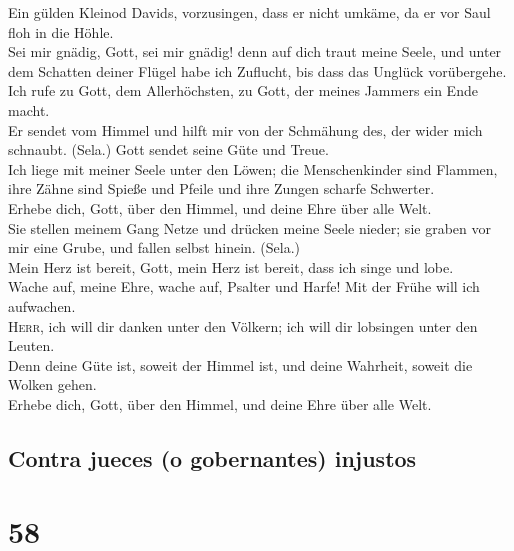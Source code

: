  Ein gülden Kleinod Davids, vorzusingen, dass er nicht
umkäme, da er vor Saul floh in die Höhle.\\
 Sei mir gnädig, Gott, sei mir gnädig! denn auf dich traut
meine Seele, und unter dem Schatten deiner Flügel habe ich Zuflucht, bis
dass das Unglück vorübergehe.\\
 Ich rufe zu Gott, dem Allerhöchsten, zu Gott, der meines
Jammers ein Ende macht.\\
 Er sendet vom Himmel und hilft mir von der Schmähung des,
der wider mich schnaubt. (Sela.) Gott sendet seine Güte und Treue.\\
 Ich liege mit meiner Seele unter den Löwen; die
Menschenkinder sind Flammen, ihre Zähne sind Spieße und Pfeile und ihre
Zungen scharfe Schwerter.\\
 Erhebe dich, Gott, über den Himmel, und deine Ehre über
alle Welt.\\
 Sie stellen meinem Gang Netze und drücken meine Seele
nieder; sie graben vor mir eine Grube, und fallen selbst hinein.
(Sela.)\\
 Mein Herz ist bereit, Gott, mein Herz ist bereit, dass
ich singe und lobe.\\
 Wache auf, meine Ehre, wache auf, Psalter und Harfe! Mit
der Frühe will ich aufwachen.\\
 \textsc{Herr}, ich will dir danken unter den Völkern;
ich will dir lobsingen unter den Leuten.\\
 Denn deine Güte ist, soweit der Himmel ist, und deine
Wahrheit, soweit die Wolken gehen.\\
 Erhebe dich, Gott, über den Himmel, und deine Ehre über
alle Welt.

\hypertarget{contra-jueces-o-gobernantes-injustos}{%
\subsection{Contra jueces (o gobernantes)
injustos}\label{contra-jueces-o-gobernantes-injustos}}

\hypertarget{section-57}{%
\section{58}\label{section-57}}


